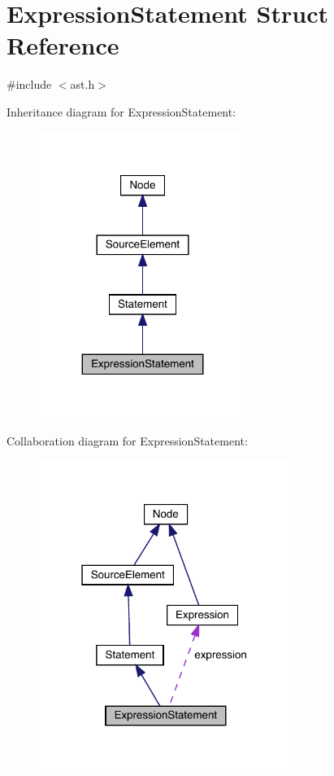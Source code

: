 \hypertarget{struct_expression_statement}{}\section{Expression\+Statement Struct Reference}
\label{struct_expression_statement}


{\ttfamily \#include $<$ast.\+h$>$}



Inheritance diagram for Expression\+Statement\+:\nopagebreak
\begin{figure}[H]
\begin{center}
\leavevmode
\includegraphics[width=191pt]{struct_expression_statement__inherit__graph}
\end{center}
\end{figure}


Collaboration diagram for Expression\+Statement\+:\nopagebreak
\begin{figure}[H]
\begin{center}
\leavevmode
\includegraphics[width=232pt]{struct_expression_statement__coll__graph}
\end{center}
\end{figure}
